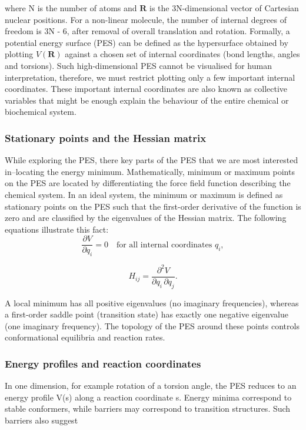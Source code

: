 \documentclass[12pt]{article}
\begin{document}
where N is the number of atoms and $\mathbf{R}$ is the 3N-dimensional vector of Cartesian nuclear positions. For a non-linear molecule, the number of internal degrees of freedom is 3N - 6, after removal of overall translation and rotation. Formally, a potential energy surface (PES) can be defined as the hypersurface obtained by plotting $V(\mathbf{R})$ against a chosen set of internal coordinates (bond lengths, angles and torsions). Such high-dimensional PES cannot be visualised for human interpretation, therefore, we must restrict plotting only a few important internal coordinates. These important internal coordinates are also known as collective variables that might be enough explain the behaviour of the entire chemical or biochemical system.

\subsubsection{Stationary points and the Hessian matrix}
 While exploring the PES, there key parts of the PES that we are most interested in--locating the energy minimum. Mathematically, minimum or maximum points on the PES are located by differentiating the force field function describing the chemical system. In an ideal system, the minimum or maximum is defined as stationary points on the PES such that the first-order derivative of the function is zero and are classified by the eigenvalues of the Hessian matrix. The following equations illustrate this fact:
\begin{equation}
  \frac{\partial V}{\partial q_i} = 0
  \quad\text{for all internal coordinates } q_i,
\end{equation}

\begin{equation}
  H_{ij} = \frac{\partial^2 V}{\partial q_i\,\partial q_j}.
\end{equation}

A local minimum has all positive eigenvalues (no imaginary frequencies), whereas a first-order saddle point (transition state) has exactly one negative eigenvalue (one imaginary frequency). The topology of the PES around these points controls conformational equilibria and reaction rates\cite{CH2_Jensen2017}.

\subsubsection{Energy profiles and reaction coordinates}

In one dimension, for example rotation of a torsion angle, the PES reduces to an energy profile V(s) along a reaction coordinate s. Energy minima correspond to stable conformers, while barriers may correspond to transition structures. Such barriers also suggest 
\end{document}
